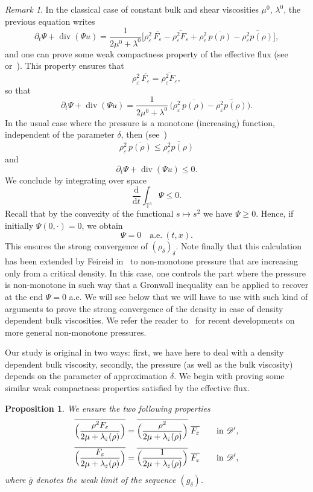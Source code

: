 \documentclass[JEP,XML,SOM,Unicode,NoEqCountersInSection]{cedram}
\let\mathcal\mathscr
\newcommand{\<}{\bigl\langle}
\renewcommand{\>}{\bigr\rangle}
\newtheorem{prop}[thm]{Proposition}
\theoremstyle{definition}
\theoremstyle{remark}
\newtheorem{remark}{Remark}
\newcommand{\TT}{\mathbb{T}^3}
\DeclareMathOperator{\Div}{div}
\newcommand{\Dt}{\dfrac{\mathrm{d}}{\mathrm{d} t}}
\let\ov\overline
\let\ep\varepsilon
\begin{document}
\begin{remark}
In the classical case of constant bulk and shear viscosities $\mu^0$, $\lambda^0$, the previous equation writes
\[
\partial_t \Psi + \Div(\Psi u)
= \dfrac{1}{2\mu^0 + \lambda^0} \bigl[\rho_\ep^2\, \ov{F_\ep } - \ov{\rho_\ep^2 F_\ep }
+ \rho_\ep^2\, \ov{ p(\rho)} - \ov{ \rho_\ep^2 p(\rho)}
\bigr],
\]
and one can prove some weak compactness property of the effective flux (see~\cite[Chap.\,5]{lions1998} or~\cite{novotny2004}).
This property ensures that
\[
\rho_\ep^2\, \ov{F_\ep } = \ov{\rho_\ep^2 F_\ep},
\]
so that
\[
\partial_t \Psi + \Div(\Psi u) = \dfrac{1}{2\mu^0 + \lambda^0}\,\bigl(\rho_\ep^2\, \ov{ p(\rho)} - \ov{ \rho_\ep^2 p(\rho)}\bigr).
\]
In the usual case where the pressure is a monotone (increasing) function, independent of the parameter $\delta$, then (see~\cite[Lem.\,3.35]{novotny2004})
\begin{equation}\label{eq:monotone-press}
\rho_\ep^2\, \ov{ p(\rho)} \leq \ov{ \rho_\ep^2 p(\rho)}
\end{equation}
and\vspace*{-3pt}
\[
\partial_t \Psi + \Div(\Psi u) \leq 0.
\]
We conclude by integrating over space
\[
\Dt \int_{\TT}\Psi \leq 0.
\]
Recall that by the convexity of the functional $s \mapsto s^2$ we have $\Psi \geq 0$.
Hence, if initially $\Psi(0,\cdot) = 0$, we obtain
\[
\Psi = 0 \quad \text{a.e.} ~(t,x).
\]
This ensures the strong convergence of $(\rho_\delta)_\delta$.
Note finally that this calculation has been extended by {Feireisl} in~\cite{feireisl2002} to non-monotone pressure that are increasing only from a critical density. In this case, one controls the part where the pressure is non-monotone in such way that a Gronwall inequality can be applied to recover at the end $\Psi = 0$ a.e.
We will see below that we will have to use with such kind of arguments to prove the strong convergence of the density in case of density dependent bulk viscosities.
We refer the reader to~\cite{bresch2018} for recent developments on more general non-monotone pressures.
\end{remark} 

Our study is original in two ways: first, we have here to deal with a density dependent bulk viscosity, secondly, the pressure (as well as the bulk viscosity) depends on the parameter of approximation $\delta$.
We begin with proving some similar weak compactness properties satisfied by the effective flux.

\begin{prop}\label{prop:compactness_F}
We ensure the two following properties
\begin{align}\label{prop:compactness_F_1}
\ov{\Bigl(\dfrac{\rho^2 F_\ep}{2\mu +\lambda_\ep(\rho)} \Bigr)} &= \ov{\Bigl(\dfrac{\rho^2}{2\mu +\lambda_\ep(\rho)}\Bigr)}~ \ov{F_\ep}\qquad \text{in } \mathcal{D}',\\[3pt]
\label{prop:compactness_F_2}
\ov{\Bigl(\dfrac{F_\ep}{2\mu +\lambda_\ep(\rho)}\Bigr)} &= \ov{\Bigl(\dfrac{1}{2\mu +\lambda_\ep(\rho)}\Bigr)}~ \ov{F_\ep}\qquad \text{in } \mathcal{D}',
\end{align}
where $\ov{g}$ denotes the weak limit of the sequence $(g_\delta)$.
\end{prop}
\end{document}
